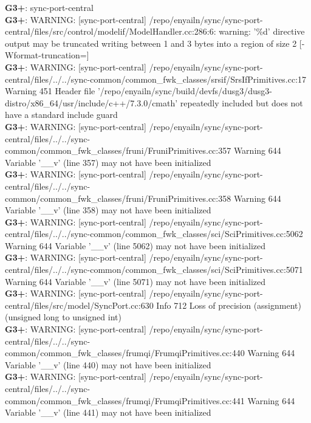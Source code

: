 \documentclass[12pt,twoside]{article}
\begin{document}
\textbf{G3+}: sync-port-central\\ 
\textbf{G3+}: WARNING: [sync-port-central] /repo/enyailn/sync/sync-port-central/files/src/control/modelif/ModelHandler.cc:286:6: warning: '\%d' directive output may be truncated writing between 1 and 3 bytes into a region of size 2 [-Wformat-truncation=]\\ 
\textbf{G3+}: WARNING: [sync-port-central] /repo/enyailn/sync/sync-port-central/files/../../sync-common/common\_fwk\_classes/srsif/SrsIfPrimitives.cc:17 Warning 451 Header file '/repo/enyailn/sync/build/devfs/dusg3/dusg3-distro/x86\_64/usr/include/c++/7.3.0/cmath' repeatedly included but does not have a standard include guard\\ 
\textbf{G3+}: WARNING: [sync-port-central] /repo/enyailn/sync/sync-port-central/files/../../sync-common/common\_fwk\_classes/fruni/FruniPrimitives.cc:357 Warning 644 Variable '\_\_v' (line 357) may not have been initialized\\ 
\textbf{G3+}: WARNING: [sync-port-central] /repo/enyailn/sync/sync-port-central/files/../../sync-common/common\_fwk\_classes/fruni/FruniPrimitives.cc:358 Warning 644 Variable '\_\_v' (line 358) may not have been initialized\\ 
\textbf{G3+}: WARNING: [sync-port-central] /repo/enyailn/sync/sync-port-central/files/../../sync-common/common\_fwk\_classes/sci/SciPrimitives.cc:5062 Warning 644 Variable '\_\_v' (line 5062) may not have been initialized\\ 
\textbf{G3+}: WARNING: [sync-port-central] /repo/enyailn/sync/sync-port-central/files/../../sync-common/common\_fwk\_classes/sci/SciPrimitives.cc:5071 Warning 644 Variable '\_\_v' (line 5071) may not have been initialized\\ 
\textbf{G3+}: WARNING: [sync-port-central] /repo/enyailn/sync/sync-port-central/files/src/model/SyncPort.cc:630 Info 712 Loss of precision (assignment) (unsigned long to unsigned int)\\ 
\textbf{G3+}: WARNING: [sync-port-central] /repo/enyailn/sync/sync-port-central/files/../../sync-common/common\_fwk\_classes/frumqi/FrumqiPrimitives.cc:440 Warning 644 Variable '\_\_v' (line 440) may not have been initialized\\ 
\textbf{G3+}: WARNING: [sync-port-central] /repo/enyailn/sync/sync-port-central/files/../../sync-common/common\_fwk\_classes/frumqi/FrumqiPrimitives.cc:441 Warning 644 Variable '\_\_v' (line 441) may not have been initialized\\ 
  
\end{document}
